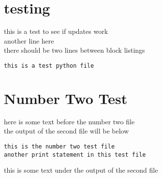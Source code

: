 \documentclass{report}
\begin{document}
\section{testing}
this is a test to see if updates work\\

another line here\\
there should be two lines between block listings\\
\begin{lstlisting}
this is a test python file

\end{lstlisting}

\section{Number Two Test}
here is some text before the number two file\\

the output of the second file will be below\\
\begin{lstlisting}
this is the number two test file
another print statement in this test file

\end{lstlisting}

this is some text under the output of the second file
\end{document}
